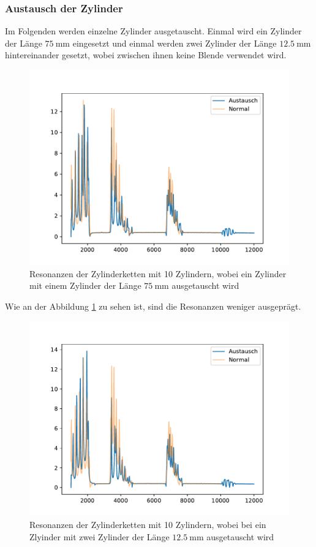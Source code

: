 \subsubsection{Austausch der Zylinder}
Im Folgenden werden einzelne Zylinder ausgetauscht. Einmal wird ein Zylinder der Länge $\SI{75}{\milli\meter}$ eingesetzt und
einmal werden zwei Zylinder der Länge $\SI{12.5}{\milli\meter}$ hintereinander gesetzt, wobei zwischen ihnen keine Blende verwendet wird.
\FloatBarrier
\begin{figure}
    \centering
    \includegraphics[width=\textwidth,keepaspectratio]{figure/Austausch_75mm.pdf}
    \caption{Resonanzen der Zylinderketten mit 10 Zylindern, wobei ein Zylinder mit einem Zylinder der Länge $\SI{75}{\milli\meter}$ ausgetauscht wird}
    \label{fig:Austausch_75}
\end{figure}
\FloatBarrier
Wie an der Abbildung \ref{fig:Austausch_75} zu sehen ist, sind die Resonanzen weniger ausgeprägt.
\FloatBarrier
\begin{figure}
    \centering
    \includegraphics[width=\textwidth,keepaspectratio]{figure/Austausch_25mm.pdf}
    \caption{Resonanzen der Zylinderketten mit 10 Zylindern, wobei bei ein Zlyinder mit zwei Zylinder der Länge $\SI{12.5}{\milli\meter}$ ausgetauscht wird}
    \label{fig:Austausch_25}
\end{figure}
